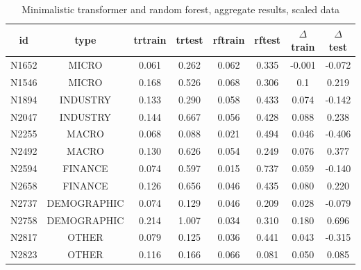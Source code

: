\documentclass[algorithms,article,submit,pdftex,moreauthors]{Definitions/mdpi}
\begin{document}
\begin{table}[H]
\caption{Minimalistic transformer and random forest, aggregate results, scaled data}
\label{tab:bestworse}
\centering
\begin{tabular}{cccccccc}
\toprule
id   & type        & trtrain & trtest & rftrain & rftest & $\Delta$train & $\Delta$test\\
\midrule
N1652 & MICRO       & 0.061 & 0.262 & 0.062 & 0.335 & -0.001 &-0.072\\
N1546 & MICRO       & 0.168 & 0.526 & 0.068 & 0.306 & 0.1   &  0.219\\
N1894 & INDUSTRY    & 0.133 & 0.290 & 0.058 & 0.433 & 0.074 & -0.142\\
N2047 & INDUSTRY    & 0.144 & 0.667 & 0.056 & 0.428 & 0.088 &  0.238\\
N2255 & MACRO       & 0.068 & 0.088 & 0.021 & 0.494 & 0.046 & -0.406\\
N2492 & MACRO       & 0.130 & 0.626 & 0.054 & 0.249 & 0.076 &  0.377\\
N2594 & FINANCE     & 0.074 & 0.597 & 0.015 & 0.737 & 0.059 & -0.140\\
N2658 & FINANCE     & 0.126 & 0.656 & 0.046 & 0.435 & 0.080 &  0.220\\
N2737 & DEMOGRAPHIC & 0.074 & 0.129 & 0.046 & 0.209 & 0.028 & -0.079\\
N2758 & DEMOGRAPHIC & 0.214 & 1.007 & 0.034 & 0.310 & 0.180 &  0.696\\
N2817 & OTHER       & 0.079 & 0.125 & 0.036 & 0.441 & 0.043 & -0.315\\
N2823 & OTHER       & 0.116 & 0.166 & 0.066 & 0.081 & 0.050 &  0.085\\
\bottomrule
\end{tabular}
\end{table}
\end{document}
